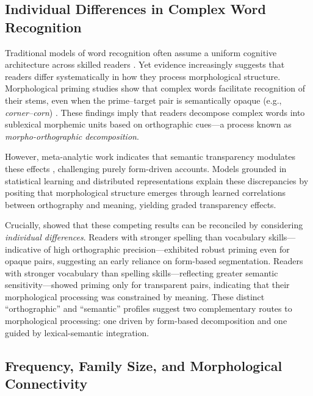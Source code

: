 \subsection{Individual Differences in Complex Word Recognition}

Traditional models of word recognition often assume a uniform cognitive architecture across skilled readers \citep{cronbachTwoDisciplinesScientific1957}. Yet evidence increasingly suggests that readers differ systematically in how they process morphological structure. Morphological priming studies show that complex words facilitate recognition of their stems, even when the prime–target pair is semantically opaque (e.g., \textit{corner–corn}) \citep{rastleBrothMyBrother2004, rastleMorphologicalDecompositionBased2008}. These findings imply that readers decompose complex words into sublexical morphemic units based on orthographic cues—a process known as \textit{morpho-orthographic decomposition}. 

However, meta-analytic work indicates that semantic transparency modulates these effects \citep{feldmanEarlyMorphologicalProcessing2009}, challenging purely form-driven accounts. Models grounded in statistical learning and distributed representations \citep{plautAreNonsemanticMorphological2000, baayenAmorphousModelMorphological2011} explain these discrepancies by positing that morphological structure emerges through learned correlations between orthography and meaning, yielding graded transparency effects. 

Crucially, \citet{andrewsMorphologicalPrimingStronger2013} showed that these competing results can be reconciled by considering \textit{individual differences}. Readers with stronger spelling than vocabulary skills—indicative of high orthographic precision—exhibited robust priming even for opaque pairs, suggesting an early reliance on form-based segmentation. Readers with stronger vocabulary than spelling skills—reflecting greater semantic sensitivity—showed priming only for transparent pairs, indicating that their morphological processing was constrained by meaning. These distinct “orthographic” and “semantic” profiles suggest two complementary routes to morphological processing: one driven by form-based decomposition and one guided by lexical-semantic integration.

\subsection{Frequency, Family Size, and Morphological Connectivity}

